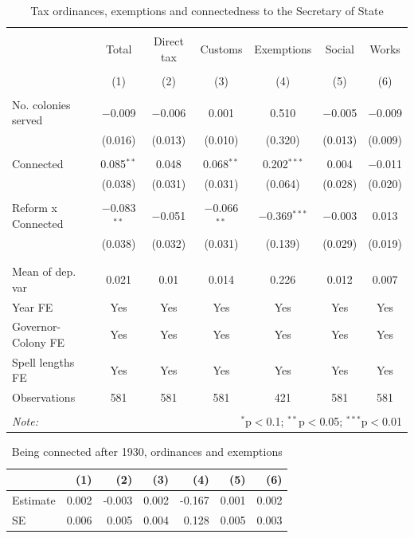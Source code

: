 \documentclass[a4paper]{article}\usepackage[]{graphicx}\usepackage[]{color}
\begin{document}
\begin{table}[!htbp] \centering 
  \caption{Tax ordinances, exemptions and connectedness to the Secretary of State} 
  \label{tab:ord} 
\scriptsize 
\begin{tabular}{@{\extracolsep{5pt}}lcccccc} 
\\[-1.8ex]\hline 
\hline \\[-1.8ex] 
 & Total & Direct tax & Customs & Exemptions & Social & Works \\ 
\\[-1.8ex] & (1) & (2) & (3) & (4) & (5) & (6)\\ 
\hline \\[-1.8ex] 
 No. colonies served & $-$0.009 & $-$0.006 & 0.001 & 0.510 & $-$0.005 & $-$0.009 \\ 
  & (0.016) & (0.013) & (0.010) & (0.320) & (0.013) & (0.009) \\ 
  & & & & & & \\ 
 Connected & 0.085$^{**}$ & 0.048 & 0.068$^{**}$ & 0.202$^{***}$ & 0.004 & $-$0.011 \\ 
  & (0.038) & (0.031) & (0.031) & (0.064) & (0.028) & (0.020) \\ 
  & & & & & & \\ 
 Reform x Connected & $-$0.083$^{**}$ & $-$0.051 & $-$0.066$^{**}$ & $-$0.369$^{***}$ & $-$0.003 & 0.013 \\ 
  & (0.038) & (0.032) & (0.031) & (0.139) & (0.029) & (0.019) \\ 
  & & & & & & \\ 
\hline \\[-1.8ex] 
Mean of dep. var & 0.021 & 0.01 & 0.014 & 0.226 & 0.012 & 0.007 \\ 
Year FE & Yes & Yes & Yes & Yes & Yes & Yes \\ 
Governor-Colony FE & Yes & Yes & Yes & Yes & Yes & Yes \\ 
Spell lengths FE & Yes & Yes & Yes & Yes & Yes & Yes \\ 
Observations & 581 & 581 & 581 & 421 & 581 & 581 \\ 
\hline 
\hline \\[-1.8ex] 
\textit{Note:}  & \multicolumn{6}{r}{$^{*}$p$<$0.1; $^{**}$p$<$0.05; $^{***}$p$<$0.01} \\ 
\end{tabular} 
\end{table} 
\begin{table}[!h]

\caption{\label{tab:combo_ord}Being connected after 1930, ordinances and exemptions}
\centering
\fontsize{7}{9}\selectfont
\begin{tabular}[t]{lrrrrrr}
\toprule
  & (1) & (2) & (3) & (4) & (5) & (6)\\
\midrule
Estimate & 0.002 & -0.003 & 0.002 & -0.167 & 0.001 & 0.002\\
SE & 0.006 & 0.005 & 0.004 & 0.128 & 0.005 & 0.003\\
\bottomrule
\end{tabular}
\end{table}
\end{document}
